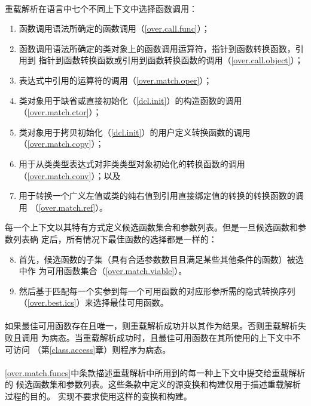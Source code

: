 \paragraph{}
重载解析在语言中七个不同上下文中选择函数调用：
\begin{enumerate}
  \item{函数调用语法所确定的函数调用（\ref{over.call.func}）；}
  \item{函数调用语法所确定的类对象上的函数调用运算符，指针到函数转换函数，引用到
    指针到函数转换函数或引用到函数转换函数的调用（\ref{over.call.object}）；}
  \item{表达式中引用的运算符的调用（\ref{over.match.oper}）；}
  \item{类对象用于缺省或直接初始化（\ref{dcl.init}）的构造函数的调用
    （\ref{over.match.ctor}）；}
  \item{类对象用于拷贝初始化（\ref{dcl.init}）的用户定义转换函数的调用
    （\ref{over.match.copy}）；}
  \item{用于从类类型表达式对非类类型对象初始化的转换函数的调用
    （\ref{over.match.conv}）；以及}
  \item{用于转换一个广义左值或类的纯右值到引用直接绑定值的转换的转换函数的调用
    （\ref{over.match.ref}）。}
\end{enumerate}
每一个上下文以其特有方式定义候选函数集合和参数列表。但是一旦候选函数和参数列表确
定后，所有情况下最佳函数的选择都是一样的：
\begin{enumerate}
  \setcounter{enumi}{7}
  \item{首先，候选函数的子集（具有合适参数数目且满足某些其他条件的函数）被选中作
    为可用函数集合（\ref{over.match.viable}）。}
  \item{然后基于匹配每一个实参到每一个可用函数的对应形参所需的隐式转换序列
    （\ref{over.best.ics}）来选择最佳可用函数。}
\end{enumerate}

\paragraph{}
如果最佳可用函数存在且唯一，则重载解析成功并以其作为结果。否则重载解析失败且调用
为病态。当重载解析成功时，且最佳可用函数在其所使用的上下文中不可访问
（第\ref{class.access}章）则程序为病态。

\paragraph{}
\ref{over.match.funcs}中条款描述重载解析中所用到的每一种上下文中提交给重载解析的
候选函数集和参数列表。这些条款中定义的源变换和构建仅用于描述重载解析过程的目的。
实现不要求使用这样的变换和构建。

